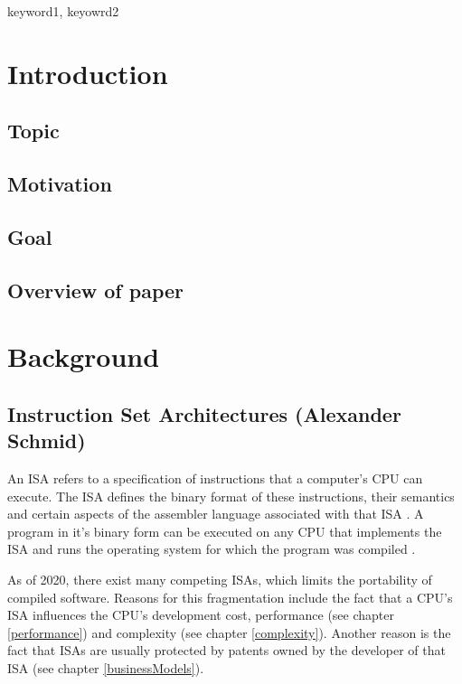 \documentclass[conference]{IEEEtran}
\begin{document}
\begin{IEEEkeywords}
keyword1, keyowrd2
\end{IEEEkeywords}

\section{Introduction}
\label{ref:introduction}
	\subsection{Topic}
	\subsection{Motivation}
	\subsection{Goal}
	\subsection{Overview of paper}

\section{Background}
\label{ref:background}
	\subsection{Instruction Set Architectures (Alexander Schmid)}
	An \gls{ISA} refers to a specification of instructions that a computer's \gls{CPU} can execute.
	The \gls{ISA} defines the binary format of these instructions, their semantics and certain aspects of the assembler
	language associated with that \gls{ISA} \cite[page 20-23]{Stokes2006}.
	A program in it's binary form can be executed on any \gls{CPU} that implements the \gls{ISA} and runs the operating system
	for which the program was compiled \cite[page 71]{Stokes2006}.

	As of 2020, there exist many competing \glspl{ISA}, which limits the portability of compiled software.
	Reasons for this fragmentation include the fact that a \gls{CPU}'s \gls{ISA} influences the \gls{CPU}'s development cost, performance (see chapter \ref{performance})
	and complexity (see chapter \ref{complexity}). Another reason is the fact that \glspl{ISA} are usually protected by patents owned by the developer of that \gls{ISA} (see chapter \ref{businessModels}).
\end{document}
